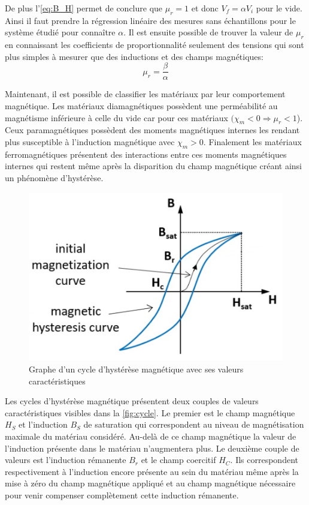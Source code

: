 De plus l'\autoref{eq:B_H} permet de conclure que \(\mu_r = 1\) et donc \(V_f = \alpha V_i\) pour le vide. Ainsi il faut prendre la régression linéaire des mesures sans échantillons pour le système étudié pour connaître \(\alpha\). Il est ensuite possible de trouver la valeur de \(\mu_r\) en connaissant les coefficients de proportionnalité seulement des tensions qui sont plus simples à mesurer que des inductions et des champs magnétiques:
\begin{equation} 
    \mu_r = \frac{\beta}{\alpha}
    \label{eq:mu_r}
\end{equation} 


Maintenant, il est possible de classifier les matériaux par leur comportement magnétique. Les matériaux diamagnétiques possèdent une perméabilité au magnétisme inférieure à celle du vide car pour ces matériaux \((\chi_m < 0 \Rightarrow \mu_r < 1\)). Ceux paramagnétiques possèdent des moments magnétiques internes les rendant plus susceptible à l'induction magnétique avec \(\chi_m > 0\). Finalement les matériaux ferromagnétiques présentent des interactions entre ces moments magnétiques internes qui restent même après la disparition du champ magnétique créant ainsi un phénomène d'hystérèse.

\begin{figure}
    \centering
    \includegraphics[width=0.7\linewidth]{figures/cycle_hysterese.png}
    \caption{Graphe d'un cycle d'hystérèse magnétique avec ses valeurs caractéristiques \cite{graph_cycle}}
    \label{fig:cycle}
\end{figure}
Les cycles d'hystérèse magnétique présentent deux couples de valeurs caractéristiques visibles dans la \autoref{fig:cycle}. Le premier est le champ magnétique \(H_S\) et l'induction \(B_S\) de saturation qui correspondent au niveau de magnétisation maximale du matériau considéré. Au-delà de ce champ magnétique la valeur de l'induction présente dans le matériau n'augmentera plus. Le deuxième couple de valeurs est l'induction rémanente \(B_r\) et le champ coercitif \(H_C\). Ils correspondent respectivement à l'induction encore présente au sein du matériau même après la mise à zéro du champ magnétique appliqué et au champ magnétique nécessaire pour venir compenser complètement cette induction rémanente.